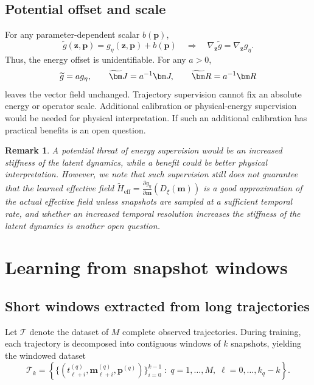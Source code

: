 \documentclass[a4paper,11pt]{article}
\newtheorem{remark}{Remark}
\newcommand{\m}{\bm m}
\newcommand{\z}{\bm z}
\newcommand{\p}{\bm p}
\newcommand{\Jop}{\bm J}
\newcommand{\Rop}{\bm R}
\newcommand{\Ddec}{D_{\xi}}
\newcommand{\Genergy}{g_{\eta}}
\begin{document}
\subsection{Potential offset and scale}
For any parameter-dependent scalar $b(\p)$,
\begin{equation}\widetilde g(\z,\p)=\Genergy(\z,\p)+b(\p)\quad\Longrightarrow\quad \nabla_{\z}\widetilde g=\nabla_{\z}\Genergy.\end{equation}
Thus, the energy offset is unidentifiable. For any $a>0$,
\begin{equation}
 \widetilde g=a\Genergy,\qquad \widetilde\Jop=a^{-1}\Jop,\qquad \widetilde\Rop=a^{-1}\Rop
 \label{eq:scale-ambiguity}
\end{equation}
leaves the vector field unchanged. Trajectory supervision cannot fix an absolute energy or operator scale. Additional calibration or physical-energy supervision would be needed for physical interpretation. If such an additional calibration has practical benefits is an open question. 

\begin{remark}
A potential threat of energy supervision would be an increased stiffness of the latent dynamics, while a benefit could be better physical interpretation. However, we note that such supervision still does not guarantee that the learned effective field $\widetilde H_{\mathrm{eff}} = \frac{\partial \Genergy}{\partial \m} (\Ddec(\m))$ is a good approximation of the actual effective field unless snapshots are sampled at a sufficient temporal rate, and whether an increased temporal resolution increases the stiffness of the latent dynamics is another open question.
\end{remark}

\section{Learning from snapshot windows}
\subsection{Short windows extracted from long trajectories}

Let $\mathcal T$ denote the dataset of $M$ complete observed trajectories. During training, each trajectory is decomposed into contiguous windows of $k$ snapshots, yielding the windowed dataset
\begin{equation}
\mathcal T_k = \left\{\{(t_{\ell+i}^{(q)}, \m_{\ell+i}^{(q)}, \p^{(q)})\}_{i=0}^{k-1}\;:\;q=1,\ldots,M,\;\ell=0,\ldots,k_q-k
\right\}.
\label{eq:windowed-dataset}
\end{equation}
\end{document}
